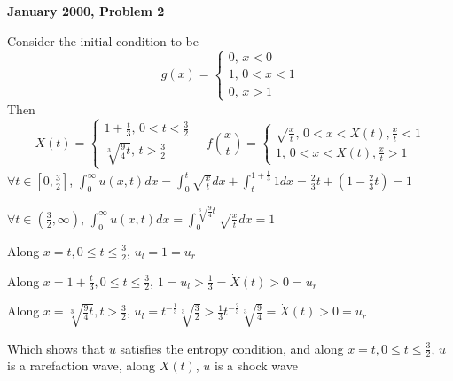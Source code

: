 \documentclass[12pt]{article}
\begin{document}
\par
\textbf{January 2000, Problem 2} \par
Consider the initial condition to be
\[
g(x)=
\left\{
\begin{array}{ll}
0,\,x<0 \\
1,\,0<x<1 \\
0,\,x>1
\end{array}
\right.
\]
Then
\[
X(t)=
\left\{
\begin{array}{ll}
1+\frac{t}{3},\,0<t<\frac{3}{2} \\
\sqrt[3]{\frac{9}{4}t},\,t>\frac{3}{2}
\end{array}
\right.
\quad
f\left(\frac{x}{t}\right)=
\left\{
\begin{array}{ll}
\sqrt{\frac{x}{t}},\,0<x<X(t),\frac{x}{t}<1 \\
1,\,0<x<X(t),\frac{x}{t}>1
\end{array}
\right.
\]
$\forall t\in\left[0,\frac{3}{2}\right]$, $\displaystyle\int_0^\infty u(x,t)dx=\int_0^t\sqrt{\frac{x}{t}}dx+\int_t^{1+\frac{t}{3}}1dx=\frac{2}{3}t+\left(1-\frac{2}{3}t\right)=1$ \par
$\forall t\in\left(\frac{3}{2},\infty\right)$, $\displaystyle\int_0^\infty u(x,t)dx=\int_0^{\sqrt[3]{\frac{9}{4}t}}\sqrt{\frac{x}{t}}dx=1$ \par
Along $x=t,0\leq t\leq\frac{3}{2}$, $u_l=1=u_r$ \par
Along $x=1+\frac{t}{3},0\leq t\leq\frac{3}{2}$, $1=u_l>\frac{1}{3}=\dot{X}(t)>0=u_r$ \par
Along $x=\sqrt[3]{\frac{9}{4}t},  t>\frac{3}{2}$, $u_l=t^{-\frac{1}{3}}\sqrt[3]{\frac{3}{2}}>\frac{1}{3}t^{-\frac{2}{3}}\sqrt[3]{\frac{9}{4}}=\dot{X}(t)>0=u_r$ \par
Which shows that $u$ satisfies the entropy condition, and along $x=t,0\leq t\leq\frac{3}{2}$, $u$ is a rarefaction wave, along $X(t)$, $u$ is a shock wave \par
{}
\end{document}
